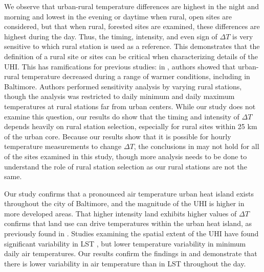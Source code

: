 \documentclass[draft,linenumbers]{agujournal}
\begin{document}
We observe that urban-rural temperature differences are highest in the night and morning and lowest in the evening or daytime when rural, open sites are considered, but that when rural, forested sites are examined, these differences are highest during the day. 
Thus, the timing, intensity, and even sign of $\Delta T$ is very sensitive to which rural station is used as a reference. 
This demonstrates that the definition of a rural site or sites can be critical when characterizing details of the UHI.
This has ramifications for previous studies: in \cite{scott2018reduced}, authors showed that urban-rural temperature decreased during a range of warmer conditions, including in Baltimore. 
Authors performed sensitivity analysis by varying rural stations, though the analysis was restricted to daily minimum and daily maximum temperatures at rural stations far from urban centers.
While our study does not examine this question, our results do show that the timing and intensity of $\Delta T$ depends heavily on rural station selection, especially for rural sites within 25 km of the urban core.  Because our results show that it is possible for hourly temperature measurements to change  
$\Delta T$, the conclusions in \cite{scott2018reduced} may not hold for all of the sites examined in this study, though more analysis needs to be done to understand the role of rural station selection as our rural stations are not the same.

Our study confirms that a pronounced air temperature urban heat island exists throughout the city of Baltimore, and the magnitude of the UHI is higher in more developed areas.
That higher intensity land exhibits higher values of $\Delta T$ confirms that land use can drive temperatures within the urban heat island, as previously found in \cite{Huang20111753,Boug10}. 
 Studies examining the spatial extent of the UHI have found significant variability in LST \citep{Huang20111753}, but lower temperature variability in minimum daily air temperatures. 
Our results confirm the findings in \cite{scott2017intraurban} and demonstrate that there is lower variability in air temperature than in LST throughout the day. 
\end{document}

